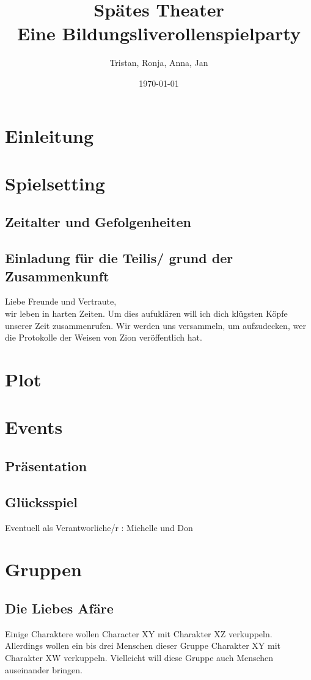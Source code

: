 \documentclass[12pt, a4paper, openany]{report}
\title{
    {Spätes Theater}\\
    {\large{Eine Bildungsliverollenspielparty}}\\
}
\author{Tristan, Ronja, Anna, Jan}
\date{\today}
\begin{document}
\maketitle
\frontmatter
\tableofcontents
\mainmatter

\chapter{Einleitung}

\chapter{Spielsetting}

\section{Zeitalter und Gefolgenheiten}

\section{Einladung für die Teilis/ grund der Zusammenkunft}
Liebe Freunde und Vertraute,\\
wir leben in harten Zeiten. 
Um dies aufuklären will ich dich klügsten Köpfe unserer Zeit zusammenrufen. 
Wir werden uns versammeln, um aufzudecken, wer die Protokolle der Weisen von Zion veröffentlich hat. 

\chapter{Plot}
\chapter{Events}
\section{Präsentation}
\section{Glücksspiel}
Eventuell als Verantworliche/r : Michelle und Don

\chapter{Gruppen}
\section{Die Liebes Afäre}
Einige Charaktere wollen Character XY mit Charakter XZ verkuppeln.
Allerdings wollen ein bis drei Menschen dieser Gruppe Charakter XY mit Charakter XW verkuppeln.
Vielleicht will diese Gruppe auch Menschen auseinander bringen.
\end{document}
